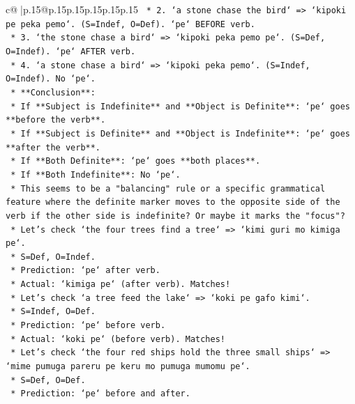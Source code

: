\documentclass{article}
\begin{document}
{\begin{supertabular}{c@{$\;$}|p{.15\linewidth}@{}p{.15\linewidth}p{.15\linewidth}p{.15\linewidth}p{.15\linewidth}p{.15\linewidth}}
{{{\texttt{                *   2. `a stone chase the bird` => `kipoki pe peka pemo`. (S=Indef, O=Def). `pe` BEFORE verb.} \\
\texttt{                *   3. `the stone chase a bird` => `kipoki peka pemo pe`. (S=Def, O=Indef). `pe` AFTER verb.} \\
\texttt{                *   4. `a stone chase a bird` => `kipoki peka pemo`. (S=Indef, O=Indef). No `pe`.} \\
\texttt{                *   **Conclusion**:} \\
\texttt{                    *   If **Subject is Indefinite** and **Object is Definite**: `pe` goes **before the verb**.} \\
\texttt{                    *   If **Subject is Definite** and **Object is Indefinite**: `pe` goes **after the verb**.} \\
\texttt{                    *   If **Both Definite**: `pe` goes **both places**.} \\
\texttt{                    *   If **Both Indefinite**: No `pe`.} \\
\texttt{                *   This seems to be a "balancing" rule or a specific grammatical feature where the definite marker moves to the opposite side of the verb if the other side is indefinite? Or maybe it marks the "focus"?} \\
\texttt{                *   Let's check `the four trees find a tree` => `kimi guri mo kimiga pe`.} \\
\texttt{                    *   S=Def, O=Indef.} \\
\texttt{                    *   Prediction: `pe` after verb.} \\
\texttt{                    *   Actual: `kimiga pe` (after verb). Matches!} \\
\texttt{                *   Let's check `a tree feed the lake` => `koki pe gafo kimi`.} \\
\texttt{                    *   S=Indef, O=Def.} \\
\texttt{                    *   Prediction: `pe` before verb.} \\
\texttt{                    *   Actual: `koki pe` (before verb). Matches!} \\
\texttt{                *   Let's check `the four red ships hold the three small ships` => `mime pumuga pareru pe keru mo pumuga mumomu pe`.} \\
\texttt{                    *   S=Def, O=Def.} \\
\texttt{                    *   Prediction: `pe` before and after.} \\
}}}
\end{supertabular}}
\end{document}
